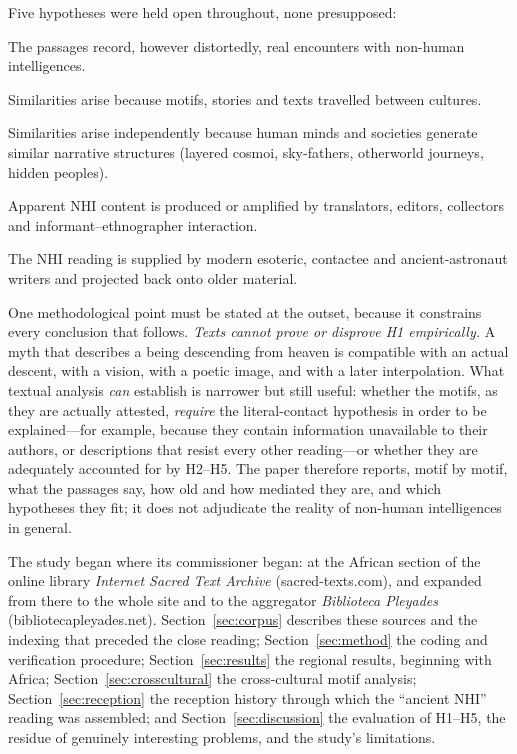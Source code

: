 \documentclass[11pt,a4paper]{article}
\begin{document}
Five hypotheses were held open throughout, none presupposed:
\begin{description}[leftmargin=2.2em,style=nextline]
\item[H1 Literal contact.] The passages record, however distortedly, real encounters with non-human intelligences.
\item[H2 Cultural diffusion and literary borrowing.] Similarities arise because motifs, stories and texts travelled between cultures.
\item[H3 Shared cognitive and structural myth-making.] Similarities arise independently because human minds and societies generate similar narrative structures (layered cosmoi, sky-fathers, otherworld journeys, hidden peoples).
\item[H4 Translation and editorial artefacts.] Apparent NHI content is produced or amplified by translators, editors, collectors and informant--ethnographer interaction.
\item[H5 Modern reinterpretation.] The NHI reading is supplied by modern esoteric, contactee and ancient-astronaut writers and projected back onto older material.
\end{description}

\noindent One methodological point must be stated at the outset, because it constrains every conclusion that follows. \emph{Texts cannot prove or disprove H1 empirically.} A myth that describes a being descending from heaven is compatible with an actual descent, with a vision, with a poetic image, and with a later interpolation. What textual analysis \emph{can} establish is narrower but still useful: whether the motifs, as they are actually attested, \emph{require} the literal-contact hypothesis in order to be explained---for example, because they contain information unavailable to their authors, or descriptions that resist every other reading---or whether they are adequately accounted for by H2--H5. The paper therefore reports, motif by motif, what the passages say, how old and how mediated they are, and which hypotheses they fit; it does not adjudicate the reality of non-human intelligences in general.

The study began where its commissioner began: at the African section of the online library \emph{Internet Sacred Text Archive} (sacred-texts.com), and expanded from there to the whole site and to the aggregator \emph{Biblioteca Pleyades} (bibliotecapleyades.net). Section~\ref{sec:corpus} describes these sources and the indexing that preceded the close reading; Section~\ref{sec:method} the coding and verification procedure; Section~\ref{sec:results} the regional results, beginning with Africa; Section~\ref{sec:crosscultural} the cross-cultural motif analysis; Section~\ref{sec:reception} the reception history through which the ``ancient NHI'' reading was assembled; and Section~\ref{sec:discussion} the evaluation of H1--H5, the residue of genuinely interesting problems, and the study's limitations.
\end{document}
